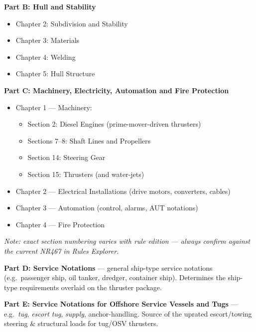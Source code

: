 \documentclass[11pt,a4paper]{report}
\begin{document}
\textbf{Part B: Hull and Stability}
\begin{itemize}[leftmargin=*]
\item Chapter 2: Subdivision and Stability
\item Chapter 3: Materials
\item Chapter 4: Welding
\item Chapter 5: Hull Structure
\end{itemize}

\textbf{Part C: Machinery, Electricity, Automation and Fire Protection}
\begin{itemize}[leftmargin=*]
\item Chapter 1 --- Machinery:
\begin{itemize}
\item Section 2: Diesel Engines (prime-mover-driven thrusters)
\item Sections 7--8: Shaft Lines and Propellers
\item Section 14: Steering Gear
\item Section 15: Thrusters (and water-jets)
\end{itemize}
\item Chapter 2 --- Electrical Installations (drive motors, converters, cables)
\item Chapter 3 --- Automation (control, alarms, AUT notations)
\item Chapter 4 --- Fire Protection
\end{itemize}
\textit{Note: exact section numbering varies with rule edition --- always confirm
against the current NR467 in Rules Explorer.}

\textbf{Part D: Service Notations} --- general ship-type service notations
(e.g.\ passenger ship, oil tanker, dredger, container ship). Determines the
ship-type requirements overlaid on the thruster package.

\textbf{Part E: Service Notations for Offshore Service Vessels and Tugs} ---
e.g.\ \emph{tug}, \emph{escort tug}, \emph{supply}, anchor-handling. Source of
the uprated escort/towing steering \& structural loads for tug/OSV thrusters.
\end{document}
